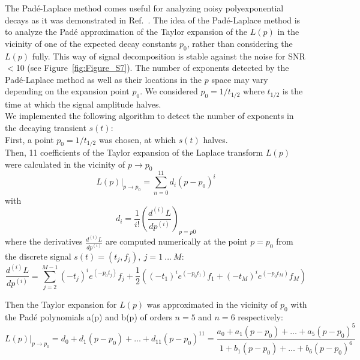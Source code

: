 The Pad{\'e}-Laplace method comes useful for analyzing noisy polyexponential decays as it was demonstrated in Ref.~\cite{Hellen_2005}. The idea of the Pad{\'e}-Laplace method is to analyze the Pad{\'e} approximation of the Taylor expansion of the $L(p)$ in the vicinity of one of the expected decay constants $p_0$, rather than considering the $L(p)$ fully. This way of signal decomposition is stable against the noise for SNR$<$10 (see Figure~\ref{fig:Figure_S7}). The number of exponents detected by the Pad{\'e}-Laplace method as well as their locations in the $p$ space may vary depending on the expansion point $p_0$. We considered $p_0=1/t_{1/2}$ where $t_{1/2}$ is the time at which the signal amplitude halves.\\

We implemented the following algorithm to detect the number of exponents in the decaying transient $s(t)$:\\

First, a point $p_0=1/t_{1/2}$ was chosen, at which $s(t)$ halves.\\

Then, 11 coefficients of the Taylor expansion of the Laplace transform $L(p)$ were calculated in the vicinity of $p \rightarrow p_0$\\

\begin{equation}
L(p)\vert_{p \rightarrow p_0} = \sum_{n=0}^{11} d_i (p-p_0)^i
\end{equation}
with
\begin{equation}
d_i = \frac{1}{i!}\left(\frac{d^{(i)}L}{dp^{(i)}}\right)_{p=p0}
\end{equation}
where the derivatives $\frac{d^{(i)}L}{dp^{(i)}}$ are computed numerically at the point $p=p_{0}$ from the discrete signal $s(t) = (t_j,f_j),~j=1~...~M$:
\begin{equation}
\frac{d^{(i)}L}{dp^{(i)}}= \sum_{j=2}^{M-1}(-t_j)^ie^{(-p_0t_j)}f_j + \frac{1}{2}\left((-t_1)^ie^{(-p_0t_1)}f_1+(-t_M)^ie^{(-p_0t_M)}f_M \right)
\end{equation}


Then the Taylor expansion for $L(p)$ was approximated in the vicinity of $p_0$ with the Pad{\'e} polynomials a(p) and b(p) of orders $n=5$ and $n=6$ respectively:\\

\begin{equation}
\label{eq:pade}
L(p)\vert_{p \rightarrow p_0} = d_0+d_1(p-p_0)+\dots+d_{11}(p-p_0)^{11}=\frac{a_0 + a_1(p-p_0) + \dots + a_5(p-p_0)^5}  {1 + b_1(p-p_0)+ \dots+ b_6(p-p_0)^6}
\end{equation}

